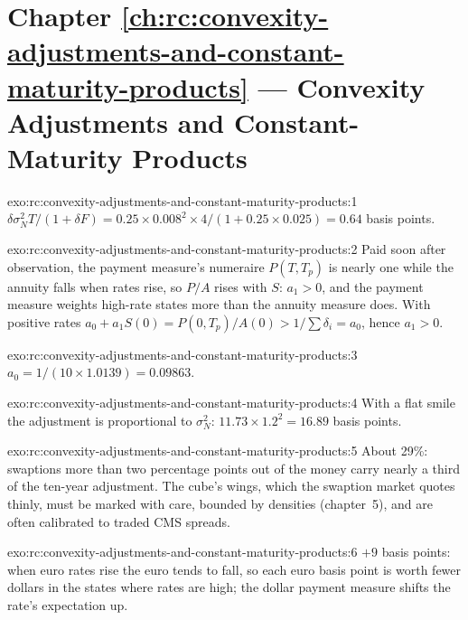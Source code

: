 \section*{Chapter \ref{ch:rc:convexity-adjustments-and-constant-maturity-products} --- Convexity Adjustments and Constant-Maturity Products}

\begin{solution}{exo:rc:convexity-adjustments-and-constant-maturity-products:1}
$\delta\sigma_N^2T/(1+\delta F) = 0.25\times0.008^2\times4/(1+0.25\times0.025) =
0.64$ basis points.
\end{solution}

\begin{solution}{exo:rc:convexity-adjustments-and-constant-maturity-products:2}
Paid soon after observation, the payment measure's numeraire $P(T,T_p)$ is
nearly one while the annuity falls when rates rise, so $P/A$ rises with $S$:
$a_1>0$, and the payment measure weights high-rate states more than the
annuity measure does. With positive rates $a_0 + a_1S(0) = P(0,T_p)/A(0) >
1/\sum\delta_i = a_0$, hence $a_1 > 0$.
\end{solution}

\begin{solution}{exo:rc:convexity-adjustments-and-constant-maturity-products:3}
$a_0 = 1/(10\times1.0139) = 0.09863$.
\end{solution}

\begin{solution}{exo:rc:convexity-adjustments-and-constant-maturity-products:4}
With a flat smile the adjustment is proportional to $\sigma_N^2$:
$11.73\times1.2^2 = 16.89$ basis points.
\end{solution}

\begin{solution}{exo:rc:convexity-adjustments-and-constant-maturity-products:5}
About 29\%: swaptions more than two percentage points out of the money carry
nearly a third of the ten-year adjustment. The cube's wings, which the swaption
market quotes thinly, must be marked with care, bounded by densities
(chapter~5), and are often calibrated to traded CMS spreads.
\end{solution}

\begin{solution}{exo:rc:convexity-adjustments-and-constant-maturity-products:6}
$+9$ basis points: when euro rates rise the euro tends to fall, so each euro basis
point is worth fewer dollars in the states where rates are high; the dollar
payment measure shifts the rate's expectation up.
\end{solution}

